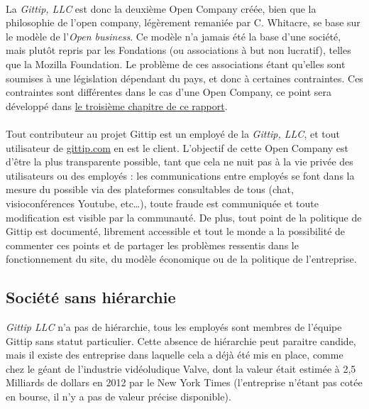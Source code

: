 \paragraph{}
La \emph{Gittip, LLC} est donc la deuxième Open Company créée, bien que la
philosophie de l'open company, légèrement remaniée par C. Whitacre, se base sur
le modèle de l'\emph{Open business}. Ce modèle n'a jamais été la base d'une
société, mais plutôt repris par les Fondations (ou associations à but non
lucratif), telles que la Mozilla Foundation. Le problème de ces associations
étant qu'elles sont soumises à une législation dépendant du pays, et donc à
certaines contraintes. Ces contraintes sont différentes dans le cas d'une Open
Company, ce point sera développé dans \hyperref[chapter3]{le troisième chapitre
de ce rapport}.

\paragraph{}
Tout contributeur au projet Gittip est un employé de la \emph{Gittip, LLC}, et
tout utilisateur de \url{gittip.com} en est le client. L'objectif de cette Open
Company est d'être la plus transparente possible, tant que cela ne nuit pas à
la vie privée des utilisateurs ou des employés : les communications entre
employés se font dans la mesure du possible via des plateformes consultables de
tous (chat, visioconférences Youtube, etc\ldots), toute fraude est communiquée
et toute modification est visible par la communauté.
De plus, tout point de la politique de Gittip est documenté, librement accessible
et tout le monde a la possibilité de commenter ces points et de partager les
problèmes ressentis dans le fonctionnement du site, du modèle économique ou de
la politique de l'entreprise.

    \subsection{Société sans hiérarchie}

\emph{Gittip LLC} n'a pas de hiérarchie, tous les employés sont membres de
l'équipe Gittip sans statut particulier. Cette absence de hiérarchie peut
paraitre candide, mais il existe des entreprise dans laquelle cela a déjà été
mis en place, comme chez le géant de l'industrie vidéoludique Valve,
dont la valeur
était estimée à 2,5 Milliards de dollars en 2012 par le New York Times
(l'entreprise n'étant pas cotée en bourse, il n'y a pas de valeur précise
disponible).

